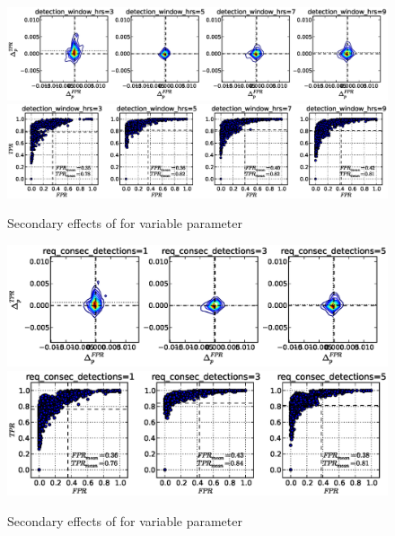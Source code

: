 \begin{figure}[!h]
\begin{center}
\includegraphics[width=6in]{../fig/final/delta_hist_sec/cmpr_window/detection_window_hrs}
\includegraphics[width=5.5in]{../fig/final/position/all_allowed/cmpr_window/detection_window_hrs}
\end{center}
\caption{\label{fig:sec} Secondary effects of  for variable
  parameter }
\end{figure}

\begin{figure}[!h]
\begin{center}
  \includegraphics[width=6in]{../fig/final/delta_hist_sec/cmpr_window/req_consec_detections}
\includegraphics[width=5.5in]{../fig/final/position/all_allowed/cmpr_window/req_consec_detections}
\end{center}
\caption{\label{fig:delta_sec6} Secondary effects of  for
  variable parameter }
\end{figure}


